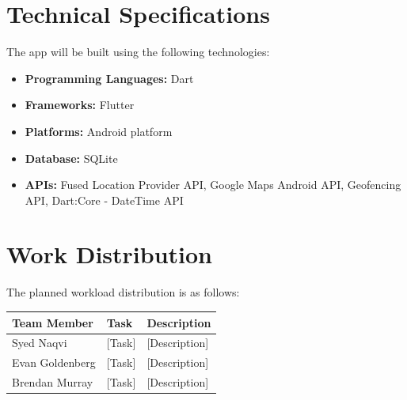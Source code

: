 \documentclass{article}
\begin{document}
\section{Technical Specifications}
The app will be built using the following technologies:
\begin{itemize}
    \item \textbf{Programming Languages:} Dart
    \item \textbf{Frameworks:} Flutter
    \item \textbf{Platforms:} Android platform
    \item \textbf{Database:} SQLite
    \item \textbf{APIs:} Fused Location Provider API, Google Maps Android API, Geofencing API, Dart:Core - DateTime API
\end{itemize}

\section{Work Distribution}
The planned workload distribution is as follows:\\

\begin{tabular}{|p{3cm}|p{4cm}|p{7cm}|}
    \hline
    \textbf{Team Member} & \textbf{Task} & \textbf{Description} \\
    \hline
    Syed Naqvi        & [Task] & [Description] \\
    Evan Goldenberg   & [Task] & [Description] \\
    Brendan Murray    & [Task] & [Description] \\
    \hline
\end{tabular}

\newpage
\end{document}
